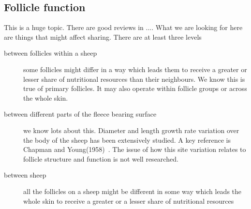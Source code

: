 \documentclass[titlepage]{article}  %
\begin{document}
\subsection{Follicle function}
This is a huge topic. There are good reviews in .... What we are looking for here are things that might affect sharing. There are at least three levels
\begin{description}
\item[between follicles within a sheep] some follicles might differ in a way which leads them to receive a greater or lesser share of nutritional resources than their neighbours. We know this is true of primary follicles. It may also operate within follicle groups or across the whole skin. 
\item[between different parts of the fleece bearing surface] we know lots about this. Diameter and length growth rate variation over the body of the sheep has been extensively studied. A key reference is Chapman and Young(1958)~\cite{chap:59}. The issue of how this site variation relates to follicle structure and function is not well researched.
\item[between sheep] all the follicles on a sheep might be different in some way which leads the whole skin to receive a greater or a lesser share of nutritional resources
\end{description}
\end{document}
